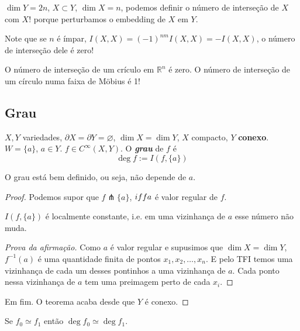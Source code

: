 \begin{remark}\leavevmode
\(\dim Y=2n\), \(X \subset Y\), \(\dim X= n\), podemos definir o número de interseção de \(X\) com \(X\)! porque perturbamos o embedding de \(X\) em \(Y\).

Note que se  \(n\) é ímpar, \(I(X,X)=(-1)^{nm}I(X,X)=-I(X,X)\), o número de interseção dele é zero!
\end{remark}

\begin{example}\leavevmode
	O número de interseção de um crículo em \(\mathbb{R}^n\) é zero. O número de interseção de um círculo numa faixa de Möbius é 1!
\end{example}

\subsection{Grau}

\begin{defn}\leavevmode
\(X,Y\) variedades, \(\partial X=\partial Y=\varnothing\), \(\dim X= \dim Y\), \(X\) compacto, \(Y\) \textbf{conexo}. \(W = \{ a\}\), \(a \in Y\). \( f \in C^\infty(X,Y)\). O  \textit{\textbf{grau}} de \(f \) é 
\[\operatorname{deg}f:=I(f, \{ a\})\]
\end{defn}

\begin{prop}\leavevmode
O grau está bem definido, ou seja, não depende de \(a\).
\end{prop}

\begin{proof}\leavevmode
Podemos supor que \(f \pitchfork  \{ a\}\), \(\\iff a\) é valor regular de \(f\).

\begin{claim}\leavevmode
\(I(f,\{a\})\) é localmente constante, i.e. em uma vizinhança de \(a\) esse número não muda.
\end{claim}

\begin{proof}[Prova da afirmação]\leavevmode
Como \(a\) é valor regular e supusimos que \(\dim X= \dim Y\), \(f^{-1}(a)\) é uma quantidade finita de pontos \(x_1,x_2,\ldots,x_n\). E pelo TFI temos uma vizinhança de cada um desses pontinhos a uma vizinhança de \(a\). Cada ponto nessa vizinhança de \(a\) tem uma preimagem perto de cada \(x_i\).
\end{proof}

Em fim. O teorema acaba desde que \(Y\) é conexo.
\end{proof}

\begin{remark}\leavevmode
Se \(f_0 \simeq f_1\) então \(\operatorname{deg}f_0 \simeq \operatorname{deg}f_1\).
\end{remark}


